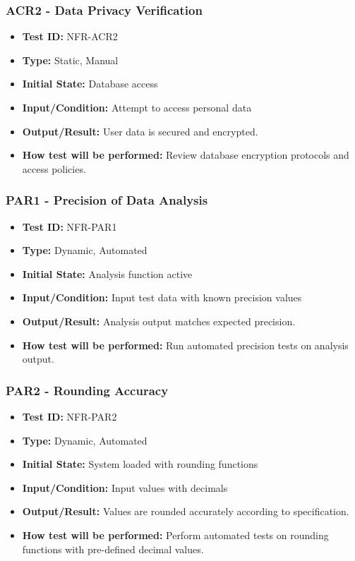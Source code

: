 \documentclass[12pt, titlepage]{article}
\begin{document}
\subsubsection{ACR2 - Data Privacy Verification}
\begin{itemize}
    \item \textbf{Test ID:} NFR-ACR2
    \item \textbf{Type:} Static, Manual
    \item \textbf{Initial State:} Database access
    \item \textbf{Input/Condition:} Attempt to access personal data
    \item \textbf{Output/Result:} User data is secured and encrypted.
    \item \textbf{How test will be performed:} Review database encryption protocols and access policies.
\end{itemize}

\subsubsection{PAR1 - Precision of Data Analysis}
\begin{itemize}
    \item \textbf{Test ID:} NFR-PAR1
    \item \textbf{Type:} Dynamic, Automated
    \item \textbf{Initial State:} Analysis function active
    \item \textbf{Input/Condition:} Input test data with known precision values
    \item \textbf{Output/Result:} Analysis output matches expected precision.
    \item \textbf{How test will be performed:} Run automated precision tests on analysis output.
\end{itemize}

\subsubsection{PAR2 - Rounding Accuracy}
\begin{itemize}
    \item \textbf{Test ID:} NFR-PAR2
    \item \textbf{Type:} Dynamic, Automated
    \item \textbf{Initial State:} System loaded with rounding functions
    \item \textbf{Input/Condition:} Input values with decimals
    \item \textbf{Output/Result:} Values are rounded accurately according to specification.
    \item \textbf{How test will be performed:} Perform automated tests on rounding functions with pre-defined decimal values.
\end{itemize}
\end{document}
